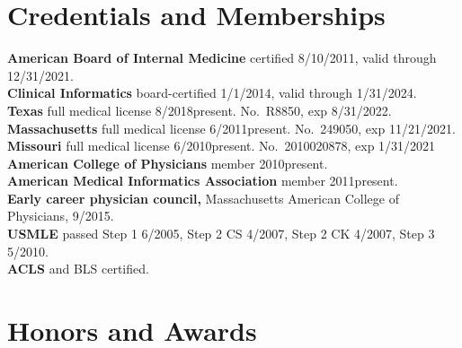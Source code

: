 \documentclass[10pt]{article}
\begin{document}
\section*{Credentials and Memberships}
\textbf{American Board of Internal Medicine} certified 8/10/2011,
valid through 12/31/2021.\\
\textbf{Clinical Informatics} board-certified 1/1/2014, valid through
1/31/2024.\\
\textbf{Texas} full medical license 8/2018\ndash{}present. No.\ R8850,
exp 8/31/2022.\\
\textbf{Massachusetts} full medical license 6/2011\ndash{}present.
No.\ 249050, exp 11/21/2021.\\
\textbf{Missouri} full medical license 6/2010\ndash{}present. No.\ 2010020878, exp 1/31/2021\\
\textbf{American College of Physicians} member 2010\ndash{}present.\\
\textbf{American Medical Informatics Association} member
2011\ndash{}present.\\
\textbf{Early career physician council,} Massachusetts American
College of Physicians, 9/\ndash{}2015.\\
\textbf{USMLE} passed Step 1 6/2005, Step 2 CS 4/2007, Step 2 CK
4/2007, Step 3 5/2010.\\
\textbf{ACLS} and BLS certified.




\section*{Honors and Awards}
\end{document}
